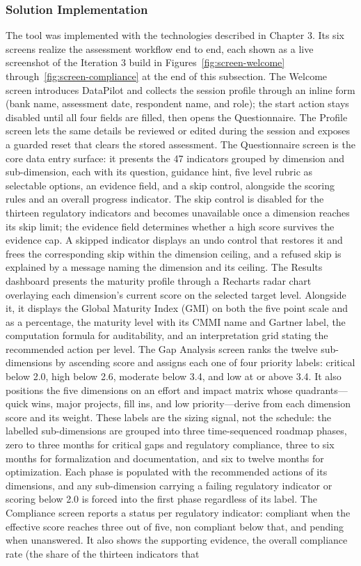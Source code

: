 \subsubsection{Solution Implementation}

The tool was implemented with the technologies described in Chapter 3. Its six screens realize the assessment workflow end to end, each shown as a live screenshot of the Iteration 3 build in Figures~\ref{fig:screen-welcome} through~\ref{fig:screen-compliance} at the end of this subsection. The Welcome screen introduces DataPilot and collects the session profile through an inline form (bank name, assessment date, respondent name, and role); the start action stays disabled until all four fields are filled, then opens the Questionnaire. The Profile screen lets the same details be reviewed or edited during the session and exposes a guarded reset that clears the stored assessment. The Questionnaire screen is the core data entry surface: it presents the 47 indicators grouped by dimension and sub-dimension, each with its question, guidance hint, five level rubric as selectable options, an evidence field, and a skip control, alongside the scoring rules and an overall progress indicator. The skip control is disabled for the thirteen regulatory indicators and becomes unavailable once a dimension reaches its skip limit; the evidence field determines whether a high score survives the evidence cap. A skipped indicator displays an undo control that restores it and frees the corresponding skip within the dimension ceiling, and a refused skip is explained by a message naming the dimension and its ceiling. The Results dashboard presents the maturity profile through a Recharts radar chart overlaying each dimension's current score on the selected target level. Alongside it, it displays the Global Maturity Index (GMI) on both the five point scale and as a percentage, the maturity level with its CMMI name and Gartner label, the computation formula for auditability, and an interpretation grid stating the recommended action per level. The Gap Analysis screen ranks the twelve sub-dimensions by ascending score and assigns each one of four priority labels: critical below 2.0, high below 2.6, moderate below 3.4, and low at or above 3.4. It also positions the five dimensions on an effort and impact matrix whose quadrants---quick wins, major projects, fill ins, and low priority---derive from each dimension score and its weight. These labels are the sizing signal, not the schedule: the labelled sub-dimensions are grouped into three time-sequenced roadmap phases, zero to three months for critical gaps and regulatory compliance, three to six months for formalization and documentation, and six to twelve months for optimization. Each phase is populated with the recommended actions of its dimensions, and any sub-dimension carrying a failing regulatory indicator or scoring below 2.0 is forced into the first phase regardless of its label. The Compliance screen reports a status per regulatory indicator: compliant when the effective score reaches three out of five, non compliant below that, and pending when unanswered. It also shows the supporting evidence, the overall compliance rate (the share of the thirteen indicators that 